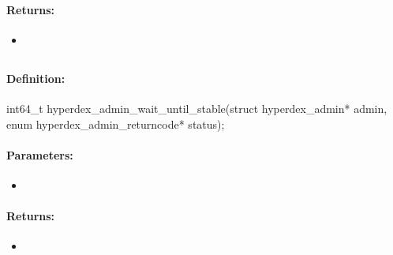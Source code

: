 \paragraph{Returns:}
\begin{itemize}[noitemsep]
\item {}\\

\end{itemize}

\pagebreak
\subsection{}
\label{api:c:wait_until_stable}


\paragraph{Definition:}
\begin{ccode}
int64_t hyperdex_admin_wait_until_stable(struct hyperdex_admin* admin,
        enum hyperdex_admin_returncode* status);
\end{ccode}

\paragraph{Parameters:}
\begin{itemize}[noitemsep]
\item {}\\

\end{itemize}

\paragraph{Returns:}
\begin{itemize}[noitemsep]
\item {}\\

\end{itemize}

\pagebreak
\subsection{}
\label{api:c:fault_tolerance}


